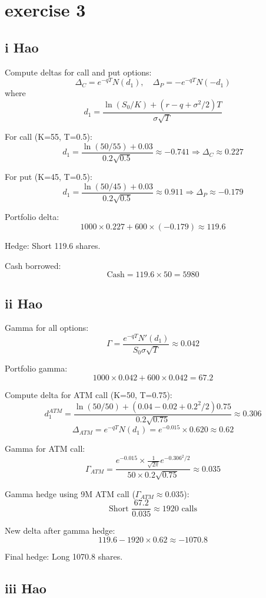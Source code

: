 \documentclass{article}
\begin{document}
\section{exercise 3}
\subsection{i Hao}
Compute deltas for call and put options:
\[
\Delta_C = e^{-qT}N(d_1), \quad \Delta_P = -e^{-qT}N(-d_1)
\]
where
\[
d_1 = \frac{\ln(S_0/K)+(r-q+\sigma^2/2)T}{\sigma\sqrt{T}}
\]

For call (K=55, T=0.5):
\[
d_1 = \frac{\ln(50/55)+0.03}{0.2\sqrt{0.5}} \approx -0.741 \Rightarrow \Delta_C \approx 0.227
\]

For put (K=45, T=0.5):
\[
d_1 = \frac{\ln(50/45)+0.03}{0.2\sqrt{0.5}} \approx 0.911 \Rightarrow \Delta_P \approx -0.179
\]

Portfolio delta:
\[
1000\times0.227 + 600\times(-0.179) \approx 119.6
\]

Hedge: Short 119.6 shares.

Cash borrowed:
\[
\text{Cash} = 119.6 \times 50 = 5980
\]

\subsection{ii Hao}

Gamma for all options:
\[
\Gamma = \frac{e^{-qT}N'(d_1)}{S_0\sigma\sqrt{T}} \approx 0.042
\]

Portfolio gamma:
\[
1000\times0.042 + 600\times0.042 = 67.2
\]

Compute delta for ATM call (K=50, T=0.75):
\[
d_1^{ATM} = \frac{\ln(50/50)+(0.04-0.02+0.2^2/2)0.75}{0.2\sqrt{0.75}} \approx 0.306
\]
\[
\Delta_{ATM} = e^{-qT}N(d_1) = e^{-0.015}\times0.620 \approx 0.62
\]

Gamma for ATM call:
\[
\Gamma_{ATM} = \frac{e^{-0.015}\times\frac{1}{\sqrt{2\pi}}e^{-0.306^2/2}}{50\times0.2\sqrt{0.75}} \approx 0.035
\]

Gamma hedge using 9M ATM call ($\Gamma_{ATM}\approx0.035$):
\[
\text{Short } \frac{67.2}{0.035} \approx 1920 \text{ calls}
\]

New delta after gamma hedge:
\[
119.6 - 1920\times0.62 \approx -1070.8
\]

Final hedge: Long 1070.8 shares.

\subsection{iii Hao}
\end{document}
